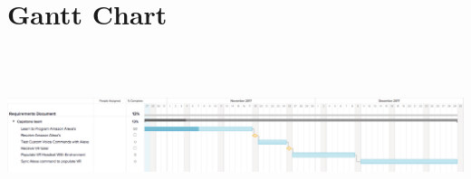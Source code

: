 \documentclass[onecolumn, draftclsnofoot,10pt, compsoc]{IEEEtran}
\begin{document}
\section{Gantt Chart}
\includegraphics[width=\textwidth,height=5cm]{Gantt}
\end{document}
